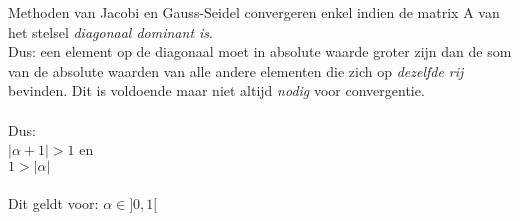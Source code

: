 Methoden van Jacobi en Gauss-Seidel convergeren enkel indien de matrix A van het stelsel \textit{diagonaal dominant is}.\\
Dus: een element op de diagonaal moet in absolute waarde groter zijn dan de som van de absolute waarden van alle andere elementen die zich op \textit{dezelfde rij} bevinden. Dit is voldoende maar niet altijd \textit{nodig} voor convergentie.\\\\
Dus:\\
$|\alpha+1| > 1$ en\\
$1 > |\alpha|$\\\\
Dit geldt voor:
$\alpha \in ]0,1[$\\
